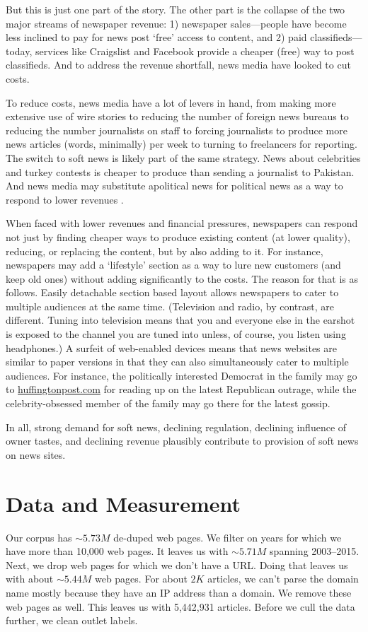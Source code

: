 \documentclass[12pt, letterpaper]{article}
\begin{document}
But this is just one part of the story. The other part is the collapse of the two major streams of newspaper revenue: 1) newspaper sales---people have become less inclined to pay for news post `free' access to content, and 2) paid classifieds---today, services like Craigslist and Facebook provide a cheaper (free) way to post classifieds. And to address the revenue shortfall, news media have looked to cut costs. 

To reduce costs, news media have a lot of levers in hand, from making more extensive use of wire stories to reducing the number of foreign news bureaus \citep{schudson2005, shanor2013} to reducing the number journalists on staff to forcing journalists to produce more news articles (words, minimally) per week to turning to freelancers for reporting. The switch to soft news is likely part of the same strategy. News about celebrities and turkey contests is cheaper to produce than sending a journalist to Pakistan. And news media may substitute apolitical news for political news as a way to respond to lower revenues \citep{cage2012trash, davis1998new, kalb1998}.

When faced with lower revenues and financial pressures, newspapers can respond not just by finding cheaper ways to produce existing content (at lower quality), reducing, or replacing the content, but by also adding to it. For instance, newspapers may add a `lifestyle' section as a way to lure new customers (and keep old ones) without adding significantly to the costs. The reason for that is as follows. Easily detachable section based layout allows newspapers to cater to multiple audiences at the same time. (Television and radio, by contrast, are different. Tuning into television means that you and everyone else in the earshot is exposed to the channel you are tuned into unless, of course, you listen using headphones.) A surfeit of web-enabled devices means that news websites are similar to paper versions in that they can also simultaneously cater to multiple audiences. For instance, the politically interested Democrat in the family may go to \href{huffingtonpost.com}{huffingtonpost.com} for reading up on the latest Republican outrage, while the celebrity-obsessed member of the family may go there for the latest gossip. 

In all, strong demand for soft news, declining regulation, declining influence of owner tastes, and declining revenue plausibly contribute to provision of soft news on news sites.

\section*{Data and Measurement}
Our corpus has $\sim 5.73M$ de-duped web pages. We filter on years for which we have more than 10,000 web pages. It leaves us with $\sim 5.71M$  spanning 2003--2015. Next, we drop web pages for which we don't have a URL. Doing that leaves us with about $\sim 5.44M$ web pages. For about $2K$ articles, we can't parse the domain name mostly because they have an IP address than a domain. We remove these web pages as well. This leaves us with 5,442,931 articles. Before we cull the data further, we clean outlet labels. 
\end{document}
